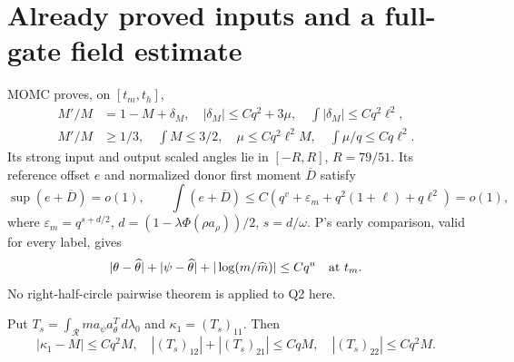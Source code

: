 \documentclass[11pt]{article}
\theoremstyle{remark}\newtheorem{remark}[theorem]{Remark}
\newcommand{\dd}{\,d}
\newcommand{\eps}{\varepsilon}
\begin{document}
\section{Already proved inputs and a full-gate field estimate}
MOMC proves, on $[t_m,t_h]$,
\begin{align}
 M'/M&=1-M+\delta_M,\quad
 |\delta_M|\le Cq^2+3\mu,\quad \int|\delta_M|\le Cq^2\ell^2,\nonumber\\
 M'/M&\ge1/3,\quad \int M\le3/2,\quad
 \mu\le Cq^2\ell^2M,\quad \int\mu/q\le Cq\ell^2 .
 \label{an02q2ecv1:inputs}
\end{align}
Its strong input and output scaled angles lie in $[-R,R]$,
$R=79/51$. Its reference offset $e$ and normalized donor
first moment $\overline D$ satisfy
\begin{equation}
 \sup(e+\overline D)=o(1),\qquad
 \int(e+\overline D)\le
 C(q^v+\eps_m+q^2(1+\ell)+q\ell^2)=o(1),
 \label{an02q2ecv1:donors}
\end{equation}
where $\eps_m=q^{s+d/2}$, $d=(1-\lambda\Phi(\rho a_\rho))/2$,
$s=d/\omega$. P's early comparison, valid for every label, gives
\begin{equation}
 |\theta-\widehat\theta|+|\psi-\widehat\theta|
   +|\log(m/\widehat m)|\le Cq^u\quad\hbox{at }t_m.
 \label{an02q2ecv1:early}
\end{equation}
No right-half-circle pairwise theorem is applied to Q2 here.

Put $T_s=\int_{\mathcal R}m a_\psi a_\theta^T\dd\lambda_0$ and
$\kappa_1=(T_s)_{11}$. Then
\begin{equation}
 |\kappa_1-M|\le Cq^2M,\quad
 |(T_s)_{12}|+|(T_s)_{21}|\le CqM,\quad |(T_s)_{22}|\le Cq^2M.
 \label{an02q2ecv1:matrixmoments}
\end{equation}
\end{document}
